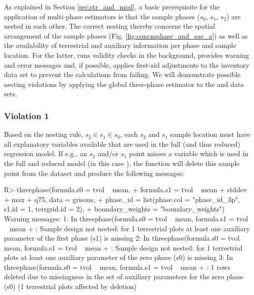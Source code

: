As explained in Section \ref{sec:str_and_mod}, a basic prerequisite for the application of multi-phase estimators is that the sample phases ($s_0$, $s_1$, $s_2$) are nested in each other. The correct nesting thereby concerns the spatial arrangement of the sample phases (Fig. \ref{fig:concmphase_and_sae_a}) as well as the availability of terrestrial and auxiliary information per phase and sample location. For the latter,  runs validity checks in the background, provides warning and error messages and, if possible, applies first-aid adjustments to the inventory data set to prevent the calculations from failing. We will demonstrate possible nesting violations by applying the global three-phase estimator to the  and  data sets.

\subsubsection*{Violation 1}

Based on the nesting rule, $s_2 \in s_1 \in s_0$, each $s_2$ and $s_1$ sample location must have all explanatory variables available that are used in the full (and thus reduced) regression model. If e.g., an $s_2$ and/or $s_1$ point misses a variable which is used in the full and reduced model (in this case ), the function will delete this sample point from the dataset and produce the following messages:  

\begin{small}
\begin{Schunk}
\end{Schunk}
\end{small}

\begin{small}
\begin{Schunk}
\begin{Sinput}
R> threephase(formula.s0 = tvol ~ mean, 
+    formula.s1 = tvol ~  mean + stddev + max + q75, data = grisons,
+    phase_id = list(phase.col = "phase_id_3p", s1.id = 1, terrgrid.id = 2),
+    boundary_weights = "boundary_weights")
Warning messages:
1: In threephase(formula.s0 = tvol ~ mean, formula.s1 = tvol ~ mean +  :
  Sample design not nested: for 1 terrestrial plots at least one auxiliary 
  parameter of the first phase (s1) is missing
2: In threephase(formula.s0 = tvol ~ mean, formula.s1 = tvol ~ mean +  :
  Sample design not nested: for 1 terrestrial plots at least one auxiliary 
  parameter of the zero phase (s0) is missing
3: In threephase(formula.s0 = tvol ~ mean, formula.s1 = tvol ~ mean +  :
  1 rows deleted due to missingness in the set of auxiliary parameters for the 
  zero phase (s0) (1 terrestrial plots affected by deletion)
\end{Sinput}
\end{Schunk}
\end{small}

